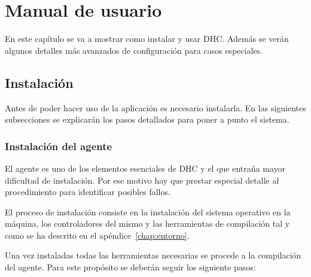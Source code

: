 \chapter{Manual de usuario} 

En este capítulo se va a mostrar como instalar y usar DHC. Además se verán algunos detalles más avanzados de configuración para casos especiales.

\section{Instalación}

Antes de poder hacer uso de la aplicación es necesario instalarla. En las siguientes subsecciones se explicarán los pasos detallados para poner a punto el sistema.

\subsection{Instalación del agente}

El agente es uno de los elementos esenciales de DHC y el que entraña mayor dificultad de instalación. Por ese motivo hay que prestar especial detalle al procedimiento para identificar posibles fallos.

El proceso de instalación consiste en la instalación del sistema operativo en la máquina, los controladores del mismo y las herramientas de compilación tal y como se ha descrito en el apéndice~\ref{chap:entorno}.

Una vez instaladas todas las herramientas necesarias se procede a la compilación del agente. Para este propósito se deberán seguir los siguiente pasos:

